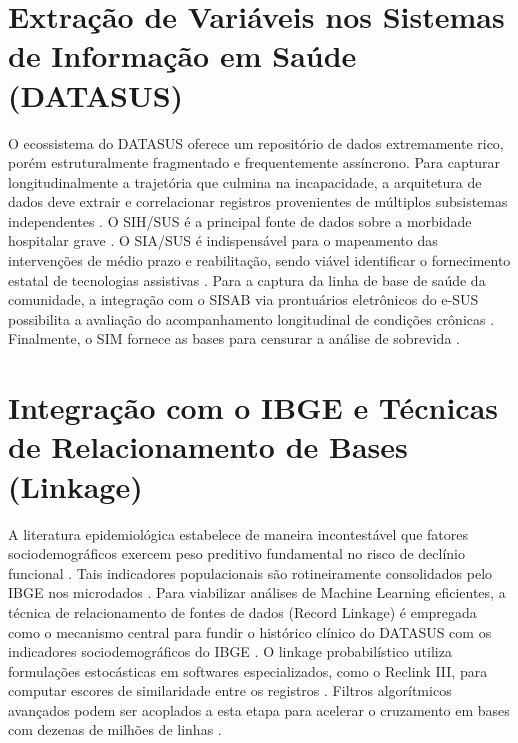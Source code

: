 \documentclass[12pt,openright,oneside,a4paper,brazil]{abntex2}
\begin{document}
\section{Extração de Variáveis nos Sistemas de Informação em Saúde (DATASUS)}
O ecossistema do DATASUS oferece um repositório de dados extremamente rico, porém estruturalmente fragmentado e frequentemente assíncrono. Para capturar longitudinalmente a trajetória que culmina na incapacidade, a arquitetura de dados deve extrair e correlacionar registros provenientes de múltiplos subsistemas independentes \cite{ref8, ref21}. O SIH/SUS é a principal fonte de dados sobre a morbidade hospitalar grave \cite{ref3, ref8}. O SIA/SUS é indispensável para o mapeamento das intervenções de médio prazo e reabilitação, sendo viável identificar o fornecimento estatal de tecnologias assistivas \cite{ref8, ref9}. Para a captura da linha de base de saúde da comunidade, a integração com o SISAB via prontuários eletrônicos do e-SUS possibilita a avaliação do acompanhamento longitudinal de condições crônicas \cite{ref8, ref17}. Finalmente, o SIM fornece as bases para censurar a análise de sobrevida \cite{ref21}.

\section{Integração com o IBGE e Técnicas de Relacionamento de Bases (Linkage)}
A literatura epidemiológica estabelece de maneira incontestável que fatores sociodemográficos exercem peso preditivo fundamental no risco de declínio funcional \cite{ref1, ref6, ref7}. Tais indicadores populacionais são rotineiramente consolidados pelo IBGE nos microdados \cite{ref5, ref8, ref22}. Para viabilizar análises de Machine Learning eficientes, a técnica de relacionamento de fontes de dados (Record Linkage) é empregada como o mecanismo central para fundir o histórico clínico do DATASUS com os indicadores sociodemográficos do IBGE \cite{ref9, ref23}. O linkage probabilístico utiliza formulações estocásticas em softwares especializados, como o Reclink III, para computar escores de similaridade entre os registros \cite{ref9, ref24}. Filtros algorítmicos avançados podem ser acoplados a esta etapa para acelerar o cruzamento em bases com dezenas de milhões de linhas \cite{ref25}.
\end{document}
